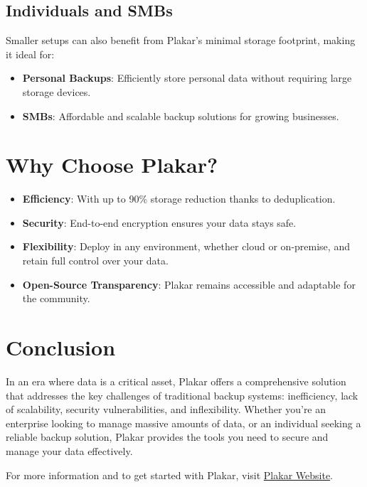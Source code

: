 \documentclass{article}
\begin{document}
\subsection*{Individuals and SMBs}

Smaller setups can also benefit from Plakar's minimal storage footprint, making it ideal for:
\begin{itemize}
    \item \textbf{Personal Backups}: Efficiently store personal data without requiring large storage devices.
    \item \textbf{SMBs}: Affordable and scalable backup solutions for growing businesses.
\end{itemize}

\section*{Why Choose Plakar?}

\begin{itemize}
    \item \textbf{Efficiency}: With up to 90\% storage reduction thanks to deduplication.
    \item \textbf{Security}: End-to-end encryption ensures your data stays safe.
    \item \textbf{Flexibility}: Deploy in any environment, whether cloud or on-premise, and retain full control over your data.
    \item \textbf{Open-Source Transparency}: Plakar remains accessible and adaptable for the community.
\end{itemize}

\section*{Conclusion}

In an era where data is a critical asset, Plakar offers a comprehensive solution that addresses the key challenges of traditional backup systems: inefficiency, lack of scalability, security vulnerabilities, and inflexibility. Whether you're an enterprise looking to manage massive amounts of data, or an individual seeking a reliable backup solution, Plakar provides the tools you need to secure and manage your data effectively.

For more information and to get started with Plakar, visit \href{https://plakar.com}{Plakar Website}.
\end{document}
